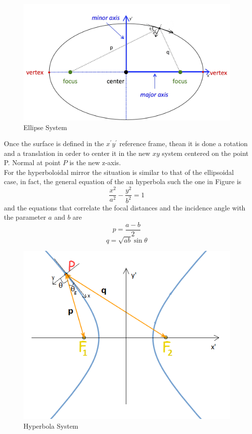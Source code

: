 %
\begin{figure}[H]
%
\centering
%
\includegraphics[width=.8\textwidth]{Immagini/Chapter3/EllipseSystem3}
%
\caption{Ellipse System}
%
\label{fig: ellipse}
%
\end{figure}
%
Once the surface is defined in the $x^{'}y^{'} $ reference frame, thean it is done a rotation and a translation in order to center it in the new $xy $ system centered on the point P. Normal at point $P $ is the new z-axis.
\\
For the hyperboloidal mirror the situation is similar to that of the ellipsoidal case, in fact, the general equation of the an hyperbola such the one in Figure is 
%
\begin{equation}
\frac{x^2}{a^2} - \frac{y^2}{b^2} = 1
\end{equation}
%
and the equations that correlate the focal distances and the incidence angle with the parameter $a $ and $b $ are
%
\begin{equation}
p = \frac{a - b}{2}
\label{eq: 1stHypEq}
\end{equation}
%
\begin{equation}
q = \sqrt{ab} \sin\theta
\label{eq: 2ndHypEq}
\end{equation}
%
\begin{figure}[H]
%
\centering
%
\includegraphics[width=.5\textwidth]{Immagini/Chapter3/Hyperbola}
%
\caption{Hyperbola System}
%
\label{fig: hyperbola}
%
\end{figure}
